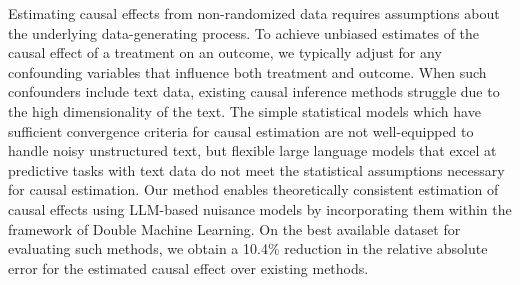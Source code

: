 Estimating causal effects from non-randomized data requires assumptions about the underlying data-generating process. To achieve unbiased estimates of the causal effect of a treatment on an outcome, we typically adjust for any confounding variables that influence both treatment and outcome. When such confounders include text data, existing causal inference methods struggle due to the high dimensionality of the text. The simple statistical models which have sufficient convergence criteria for causal estimation are not well-equipped to handle noisy unstructured text, but flexible large language models that excel at predictive tasks with text data do not meet the statistical assumptions necessary for causal estimation. Our method enables theoretically consistent estimation of causal effects using LLM-based nuisance models by incorporating them within the framework of Double Machine Learning. On the best available dataset for evaluating such methods, we obtain a 10.4\% reduction in the relative absolute error for the estimated causal effect over existing methods.